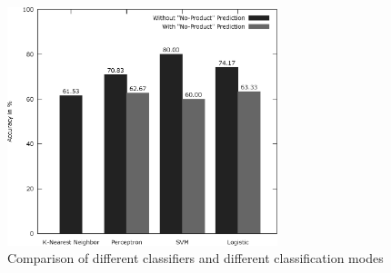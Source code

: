 \begin{figure}
	\begin{center}
		\includegraphics[width=0.7\textwidth]{figures/product_eval.eps}
	\end{center}
	\caption{Comparison of different classifiers and different classification modes}
	\label{fig:product_eval}
\end{figure}

